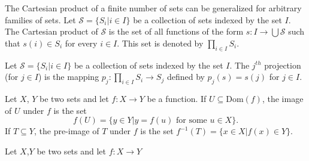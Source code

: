 \documentclass[../main.tex]{subfiles}
\begin{document}
The Cartesian product of a finite number of sets can be generalized for arbitrary families of sets. Let $\mathcal{S}=\{S_i|i\in I\}$ be a collection of sets indexed by the set $I$. The Cartesian product of $\mathcal{S}$ is the set of all functions of the form $s:I\rightarrow \bigcup\mathcal{S}$ such that $s(i)\in S_i$ for every $i\in I$. This set is denoted by $\prod_{i\in I}S_i$.

\begin{purple}
\begin{definition}
Let $\mathcal{S}=\{S_i|i\in I\}$ be a collection of sets indexed by the set $I$. The $j^{th}$ projection (for $j\in I$) is the mapping $p_j:\prod_{i\in I}S_i\rightarrow S_j$ defined by $p_j(s)=s(j)$ for $j\in I$.

Let $X$, $Y$ be two sets and let $f: X\rightarrow Y$ be a function. If $U\subseteq\text{Dom}(f)$, the image of $U$ under $f$ is the set 
$$
f(U)=\{y\in Y|y=f(u)\text{ for some } u\in X\}.
$$
If $T\subseteq Y$, the pre-image of $T$ under $f$ is the set $f^{-1}(T)=\{x\in X|f(x)\in Y\}$.
\end{definition}
\end{purple}

\begin{yellow}
\begin{theorem}
Let $X$,$Y$ be two sets and let $f:X\rightarrow Y$
\end{theorem}
\end{yellow}
\end{document}
